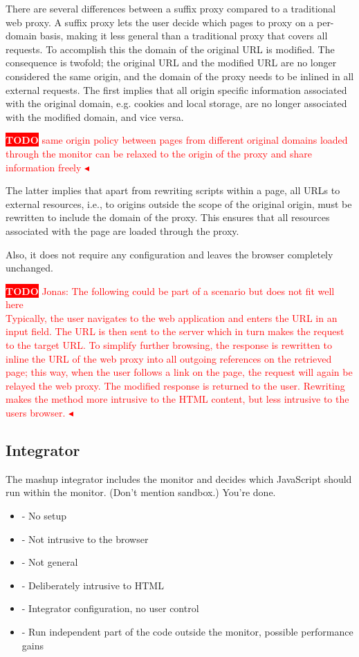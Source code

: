 \documentclass{llncs}
\newcommand{\todo}[1]{\colorbox{red}{\textcolor{white}{\sffamily\bfseries\scriptsize TODO}} \textcolor{red}{#1} \textcolor{red}{$\blacktriangleleft$}}
\begin{document}
There are several differences between a suffix proxy compared to a traditional 
web proxy. A suffix proxy lets the user decide which pages to proxy on a 
per-domain basis, making it less general than a traditional proxy that covers 
all requests. To accomplish this the domain of the original URL is modified.
The consequence is twofold; the original URL and the modified URL are no longer 
considered the same origin, and the domain of the proxy needs to 
be inlined in all external requests. The first implies that all origin specific 
information associated with the original domain, e.g. cookies and local storage, 
are no longer associated with the modified domain, and vice versa. 


\todo{same origin policy between pages from different original domains loaded through the monitor can be relaxed to the origin of the proxy and share information freely}





The latter implies that apart from rewriting scripts within a page, all URLs to external resources, i.e., to origins outside the scope of the original origin, must be rewritten to include the domain of the proxy. This ensures that all resources associated with the page are loaded through the proxy.

Also, it does not require any configuration and leaves the browser 
completely unchanged.

\todo{Jonas: The following could be part of a scenario but does not fit well here \\
Typically, the user navigates to the web application and enters the URL in 
an input field. The URL is then sent to the server which in turn makes the request to the 
target URL. To simplify further 
browsing, the response is rewritten to inline the URL of the web proxy 
into all outgoing references on the retrieved page; this way, when the user 
follows a link on the page, the request will again be relayed the web proxy. 
The modified response is returned to the user. Rewriting makes the method more 
intrusive to the HTML content, but less intrusive to the users browser.
}

\subsection{Integrator}

The mashup integrator includes the monitor and decides which JavaScript should 
run within the monitor. (Don't mention sandbox.) You're done.
\begin{itemize}
\item- No setup
\item- Not intrusive to the browser
\item- Not general
\item- Deliberately intrusive to HTML
\item- Integrator configuration, no user control
\item- Run independent part of the code outside the monitor, possible performance gains
\end{itemize}
\end{document}
